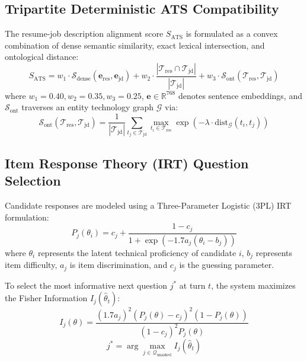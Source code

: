 \documentclass[journal,10pt,twocolumn]{IEEEtran}
\begin{document}
\subsection{Tripartite Deterministic ATS Compatibility}
The resume-job description alignment score $S_{\text{ATS}}$ is formulated as a convex combination of dense semantic similarity, exact lexical intersection, and ontological distance:
\begin{equation}
S_{\text{ATS}} = w_1 \cdot \mathcal{S}_{\text{dense}}(\mathbf{e}_{\text{res}}, \mathbf{e}_{\text{jd}}) + w_2 \cdot \frac{|\mathcal{T}_{\text{res}} \cap \mathcal{T}_{\text{jd}}|}{|\mathcal{T}_{\text{jd}}|} + w_3 \cdot \mathcal{S}_{\text{ont}}(\mathcal{T}_{\text{res}}, \mathcal{T}_{\text{jd}})
\end{equation}
where $w_1 = 0.40, w_2 = 0.35, w_3 = 0.25$, $\mathbf{e} \in \mathbb{R}^{768}$ denotes sentence embeddings, and $\mathcal{S}_{\text{ont}}$ traverses an entity technology graph $\mathcal{G}$ via:
\begin{equation}
\mathcal{S}_{\text{ont}}(\mathcal{T}_{\text{res}}, \mathcal{T}_{\text{jd}}) = \frac{1}{|\mathcal{T}_{\text{jd}}|} \sum_{t_j \in \mathcal{T}_{\text{jd}}} \max_{t_i \in \mathcal{T}_{\text{res}}} \exp\left(-\lambda \cdot \text{dist}_{\mathcal{G}}(t_i, t_j)\right)
\end{equation}

\subsection{Item Response Theory (IRT) Question Selection}
Candidate responses are modeled using a Three-Parameter Logistic (3PL) IRT formulation:
\begin{equation}
P_j(\theta_i) = c_j + \frac{1 - c_j}{1 + \exp\left(-1.7 a_j (\theta_i - b_j)\right)}
\end{equation}
where $\theta_i$ represents the latent technical proficiency of candidate $i$, $b_j$ represents item difficulty, $a_j$ is item discrimination, and $c_j$ is the guessing parameter.

To select the most informative next question $j^*$ at turn $t$, the system maximizes the Fisher Information $I_j(\hat{\theta}_t)$:
\begin{equation}
I_j(\theta) = \frac{(1.7 a_j)^2 (P_j(\theta) - c_j)^2 (1 - P_j(\theta))}{(1 - c_j)^2 P_j(\theta)}
\end{equation}
\begin{equation}
j^* = \arg\max_{j \in \mathcal{Q}_{\text{unasked}}} I_j(\hat{\theta}_t)
\end{equation}
\end{document}
